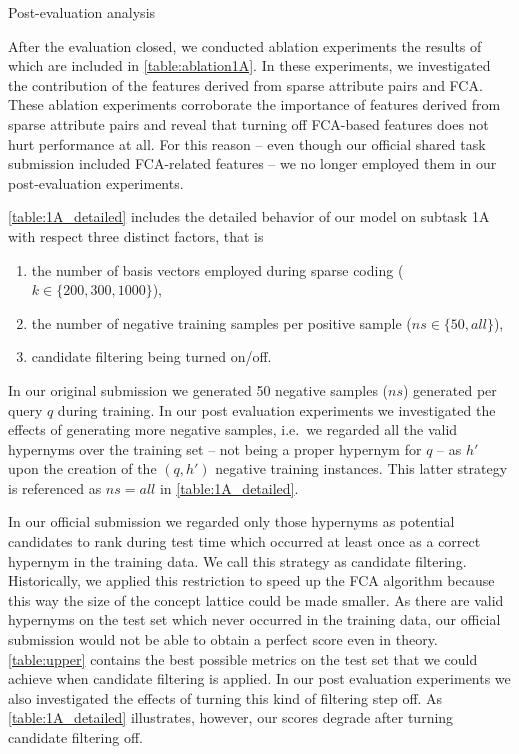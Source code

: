 \documentclass{beamer}
\newlength{\onecolwid}
\begin{document}
\begin{frame}[t]
\begin{columns}[t]
\begin{column}{\onecolwid}
\begin{block}{Post-evaluation analysis}


After the evaluation closed, we conducted ablation experiments the results of 
which are included in
\autoref{table:ablation1A}. In these experiments, we investigated the 
contribution of the features derived from sparse attribute pairs and FCA.
These ablation experiments corroborate the importance of features derived 
from sparse attribute pairs and reveal that turning off FCA-based features 
does not hurt performance at all. For this reason -- even though our official 
shared task submission included FCA-related features -- we no longer employed 
them in our post-evaluation experiments.



\autoref{table:1A_detailed} includes the detailed behavior of our model on 
subtask 1A with respect three distinct factors, that is
\begin{enumerate}
  \item the number of basis vectors employed during sparse coding ($k \in 
    \{200, 300, 1000\}$),
  \item the number of negative training samples per positive sample ($ns 
    \in \{50, all\}$),
  \item candidate filtering being turned on/off.
\end{enumerate}
In our original submission we generated 50 negative samples ($ns$) generated 
per query $q$ during training. In our post evaluation experiments we 
investigated the effects of generating more negative samples, i.e.~we regarded 
all the valid hypernyms over the training set -- not being a
proper hypernym for $q$ -- as $h'$ upon the creation of the $(q, h')$ negative 
training instances. This latter strategy is referenced as $ns=all$ in 
\autoref{table:1A_detailed}.

In our official submission we regarded only those hypernyms as potential 
candidates to rank during test time which occurred at least once as a correct 
hypernym in the training data. We call this strategy as candidate filtering. 
Historically, we applied this restriction to speed up the FCA algorithm because 
this way the size of the concept lattice could be made smaller.
As there are valid hypernyms on the test set which never occurred in the 
training data, our official submission would not be able to obtain a perfect 
score even in theory. \autoref{table:upper} contains the best possible metrics 
on the test set that we could achieve when candidate filtering is applied. In 
our post evaluation experiments we also investigated the effects of turning 
this kind of filtering step off. As \autoref{table:1A_detailed} illustrates, 
however, our scores degrade after turning candidate filtering off.


\end{block}
\end{column}
\end{columns}
\end{frame}
\end{document}

